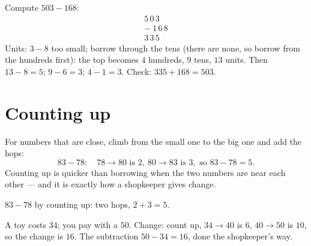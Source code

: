 \begin{example}\label{ex:g2:subtraction:worked}
Compute $503 - 168$:
\[
\begin{array}{r}
5\,0\,3 \\
-\ 1\,6\,8 \\
\hline
3\,3\,5
\end{array}
\]
Units: $3 - 8$ too small; borrow through the tens (there are none,
so borrow from the hundreds first): the top becomes $4$ hundreds,
$9$ tens, $13$ units. Then $13 - 8 = 5$; $9 - 6 = 3$;
$4 - 1 = 3$. Check: $335 + 168 = 503$. \checkmark
\end{example}

\section{Counting up}

\begin{method}\label{met:g2:subtraction:countup}
For numbers that are close, climb from the small one to the big
one and add the hops:
\[
83 - 78: \quad 78 \to 80 \text{ is } 2, \ 80 \to 83 \text{ is } 3,
\text{ so } 83 - 78 = 5 .
\]
Counting up is quicker than borrowing when the two numbers are near
each other --- and it is exactly how a shopkeeper gives change.
\end{method}

\begin{omfigure}

{\small $83 - 78$ by counting up: two hops, $2 + 3 = 5$.}
\end{omfigure}

\begin{example}\label{ex:g2:subtraction:change}
A toy costs $34$; you pay with a $50$. Change: count up,
$34 \to 40$ is $6$, $40 \to 50$ is $10$, so the change is $16$.
The subtraction $50 - 34 = 16$, done the shopkeeper's way.
\end{example}

